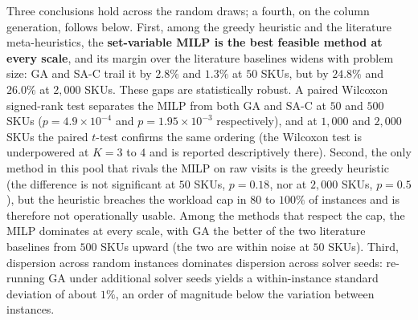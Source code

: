 \documentclass[preprint,review,11pt,authoryear]{elsarticle}
\begin{document}
\begin{table}[H]
\begin{threeparttable}
\begin{tablenotes}
  \end{tablenotes}
  \end{threeparttable}
  \caption{Multi-instance benchmark across the synthetic instance distribution, with the set-variable MILP as the per-instance reference. Rows within each scale block are sorted by ascending mean visits, with the Feasible Start (LPT) anchor placed last. Mean station visits with $95\%$ CI, mean gap to the reference, solve time under the common per-size budget, and the fraction of instances breaching the workload cap.}
  \label{tab:exp02a_reliability}
\end{table}

Three conclusions hold across the random draws; a fourth, on the column generation, follows below. First, among the greedy heuristic and the literature meta-heuristics, the \textbf{set-variable MILP is the best feasible method at every scale}, and its margin over the literature baselines widens with problem size: GA and SA-C trail it by $2.8\%$ and $1.3\%$ at $50$ SKUs, but by $24.8\%$ and $26.0\%$ at $2{,}000$ SKUs. These gaps are statistically robust. A paired Wilcoxon signed-rank test separates the MILP from both GA and SA-C at $50$ and $500$ SKUs ($p=4.9\times10^{-4}$ and $p=1.95\times10^{-3}$ respectively), and at $1{,}000$ and $2{,}000$ SKUs the paired $t$-test confirms the same ordering (the Wilcoxon test is underpowered at $K=3$ to $4$ and is reported descriptively there). Second, the only method in this pool that rivals the MILP on raw visits is the greedy heuristic (the difference is not significant at $50$ SKUs, $p=0.18$, nor at $2{,}000$ SKUs, $p=0.5$), but the heuristic breaches the workload cap in $80$ to $100\%$ of instances and is therefore not operationally usable. Among the methods that respect the cap, the MILP dominates at every scale, with GA the better of the two literature baselines from $500$ SKUs upward (the two are within noise at $50$ SKUs). Third, dispersion across random instances dominates dispersion across solver seeds: re-running GA under additional solver seeds yields a within-instance standard deviation of about $1\%$, an order of magnitude below the variation between instances.
\end{document}
